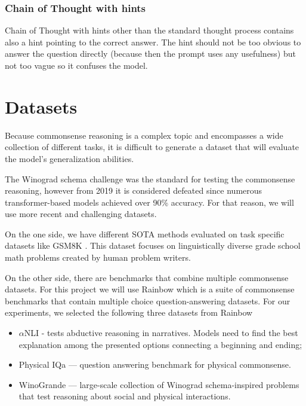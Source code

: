 \documentclass[fleqn,moreauthors,10pt]{ds_report}
\begin{document}
\subsubsection*{Chain of Thought with hints}
Chain of Thought with hints other than the standard thought process contains also a hint pointing to the correct answer. The hint should not be too obvious to answer the question directly (because then the prompt uses any usefulness) but not too vague so it confuses the model.



\section*{Datasets}
Because commonsense reasoning is a complex topic and encompasses a wide collection of different tasks, it is difficult to generate a dataset that will evaluate the model's generalization abilities.

The Winograd schema challenge \cite{levesque2012winograd} was the standard for testing the commonsense reasoning, however from 2019 it is considered defeated since numerous transformer-based models achieved over 90\% accuracy. \cite{beaten_winograd}
For that reason, we will use more recent and challenging datasets.

On the one side, we have different SOTA methods \cite{CoT} evaluated on task specific datasets like GSM8K \cite{GSMK8}. This dataset focuses on linguistically diverse grade school math problems created by human problem writers.

On the other side, there are benchmarks that combine multiple commonsense datasets. For this project we will use Rainbow which is a suite of commonsense benchmarks that contain multiple choice question-answering datasets.
For our experiments, we selected the following three datasets from Rainbow

\begin{itemize}
    \item $\alpha$NLI \cite{alphaNLI} - tests abductive reasoning in narratives. Models need to find the best explanation among the presented options connecting a beginning and ending;
    \item Physical IQa \cite{Bisk2020} — question answering benchmark for physical commonsense.
    \item WinoGrande \cite{WinoGRANDE} — large-scale collection of Winograd schema-inspired problems that test reasoning about social and physical interactions.
\end{itemize}
\end{document}
